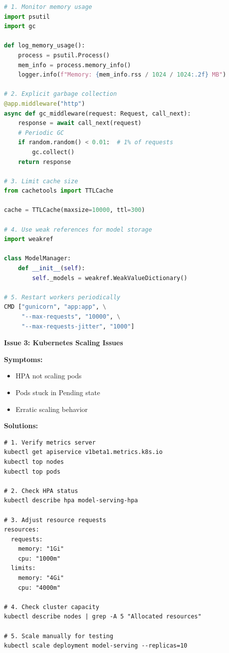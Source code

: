\begin{lstlisting}[language=Python]
# 1. Monitor memory usage
import psutil
import gc

def log_memory_usage():
    process = psutil.Process()
    mem_info = process.memory_info()
    logger.info(f"Memory: {mem_info.rss / 1024 / 1024:.2f} MB")

# 2. Explicit garbage collection
@app.middleware("http")
async def gc_middleware(request: Request, call_next):
    response = await call_next(request)
    # Periodic GC
    if random.random() < 0.01:  # 1% of requests
        gc.collect()
    return response

# 3. Limit cache size
from cachetools import TTLCache

cache = TTLCache(maxsize=10000, ttl=300)

# 4. Use weak references for model storage
import weakref

class ModelManager:
    def __init__(self):
        self._models = weakref.WeakValueDictionary()

# 5. Restart workers periodically
CMD ["gunicorn", "app:app", \
     "--max-requests", "10000", \
     "--max-requests-jitter", "1000"]
\end{lstlisting}

\textbf{Issue 3: Kubernetes Scaling Issues}

\textbf{Symptoms:}
\begin{itemize}
    \item HPA not scaling pods
    \item Pods stuck in Pending state
    \item Erratic scaling behavior
\end{itemize}

\textbf{Solutions:}

\begin{lstlisting}[style=shell]
# 1. Verify metrics server
kubectl get apiservice v1beta1.metrics.k8s.io
kubectl top nodes
kubectl top pods

# 2. Check HPA status
kubectl describe hpa model-serving-hpa

# 3. Adjust resource requests
resources:
  requests:
    memory: "1Gi"
    cpu: "1000m"
  limits:
    memory: "4Gi"
    cpu: "4000m"

# 4. Check cluster capacity
kubectl describe nodes | grep -A 5 "Allocated resources"

# 5. Scale manually for testing
kubectl scale deployment model-serving --replicas=10
\end{lstlisting}


